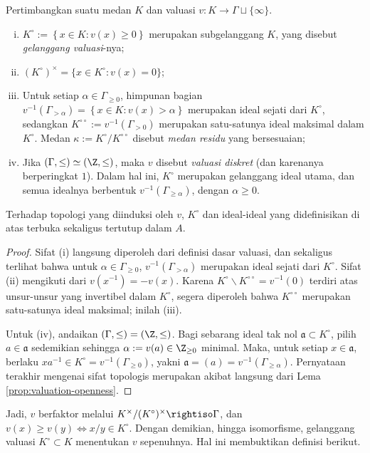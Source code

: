 \begin{definition-theorem}\label{def:valuation-field}  
	Pertimbangkan suatu medan $K$ dan valuasi $v: K \to \Gamma \sqcup \{\infty\}$.
	\begin{enumerate}[(i)]
		\item $K^\circ := \left\{x \in K: v(x) \geq 0 \right\}$ merupakan subgelanggang $K$, yang disebut \emph{gelanggang valuasi}-nya;
		\item $(K^\circ)^\times = \{x \in K^\circ: v(x)=0 \}$;
		\item Untuk setiap $\alpha \in \Gamma_{\geq 0}$, himpunan bagian $v^{-1}(\Gamma_{> \alpha}) = \left\{ x \in K : v(x) > \alpha \right\}$ merupakan ideal sejati dari $K^\circ$, sedangkan $K^{\circ\circ} := v^{-1}(\Gamma_{>0})$ merupakan satu-satunya ideal maksimal dalam $K^\circ$. Medan $\kappa := K^\circ/K^{\circ\circ}$ disebut \emph{medan residu} yang bersesuaian;
		\item Jika $(\Gamma, \leq) \simeq (\Z, \leq)$, maka $v$ disebut \emph{valuasi diskret} (dan karenanya berperingkat $1$). Dalam hal ini, $K^\circ$ merupakan gelanggang ideal utama, dan semua idealnya berbentuk $v^{-1}(\Gamma_{\geq \alpha})$, dengan $\alpha \geq 0$. 
	\end{enumerate}
	Terhadap topologi yang diinduksi oleh $v$, $K^\circ$ dan ideal-ideal yang didefinisikan di atas terbuka sekaligus tertutup dalam $A$.
\end{definition-theorem}
\begin{proof}
	Sifat (i) langsung diperoleh dari definisi dasar valuasi, dan sekaligus terlihat bahwa untuk $\alpha \in \Gamma_{\geq 0}$, $v^{-1}(\Gamma_{> \alpha})$ merupakan ideal sejati dari $K^\circ$. Sifat (ii) mengikuti dari $v(x^{-1}) = -v(x)$. Karena $K^\circ \smallsetminus K^{\circ\circ} = v^{-1}(0)$ terdiri atas unsur-unsur yang invertibel dalam $K^\circ$, segera diperoleh bahwa $K^{\circ\circ}$ merupakan satu-satunya ideal maksimal; inilah (iii).
	
	Untuk (iv), andaikan $(\Gamma, \leq) = (\Z, \leq)$. Bagi sebarang ideal tak nol $\mathfrak{a} \subset K^\circ$, pilih $a \in \mathfrak{a}$ sedemikian sehingga $\alpha := v(a) \in \Z_{\geq 0}$ minimal. Maka, untuk setiap $x \in \mathfrak{a}$, berlaku $xa^{-1} \in K^\circ = v^{-1}(\Gamma_{\geq 0})$, yakni $\mathfrak{a} = (a) = v^{-1}(\Gamma_{\geq \alpha})$. Pernyataan terakhir mengenai sifat topologis merupakan akibat langsung dari Lema \ref{prop:valuation-openness}.
\end{proof}
Jadi, $v$ berfaktor melalui $K^\times/(K^\circ)^\times \rightiso \Gamma$, dan $v(x) \geq v(y) \iff x/y \in K^\circ$. Dengan demikian, hingga isomorfisme, gelanggang valuasi $K^\circ \subset K$ menentukan $v$ sepenuhnya. Hal ini membuktikan definisi berikut.

